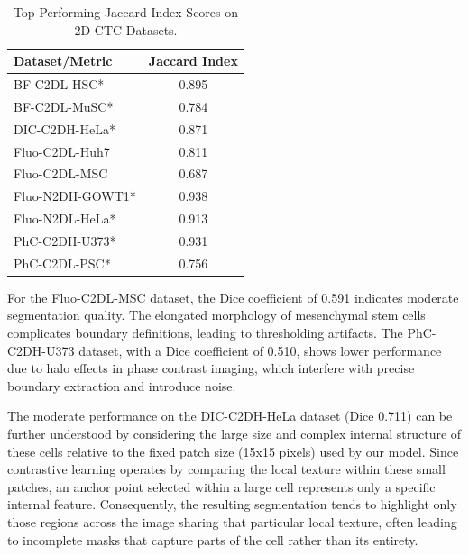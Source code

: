 \documentclass[./dissertation.tex]{subfiles}
\begin{document}

\begin{table}[h] %
    \centering
    \caption{Top-Performing Jaccard Index Scores on 2D CTC Datasets.} %
    \label{tab:ctc_sota_top1_ji_2d_transposed} %
    \begin{tabular}{|l|c|} %
        \hline
        Dataset/Metric   & Jaccard Index \\ \hline
        BF-C2DL-HSC*     & 0.895         \\ \hline
        BF-C2DL-MuSC*    & 0.784         \\ \hline
        DIC-C2DH-HeLa*   & 0.871         \\ \hline
        Fluo-C2DL-Huh7   & 0.811         \\ \hline
        Fluo-C2DL-MSC    & 0.687         \\ \hline
        Fluo-N2DH-GOWT1* & 0.938         \\ \hline
        Fluo-N2DL-HeLa*  & 0.913         \\ \hline
        PhC-C2DH-U373*   & 0.931         \\ \hline
        PhC-C2DL-PSC*    & 0.756         \\ \hline
    \end{tabular}
\end{table}

For the Fluo-C2DL-MSC dataset, the Dice coefficient of 0.591 indicates moderate segmentation quality. The elongated morphology of mesenchymal stem cells complicates boundary definitions, leading to thresholding artifacts. The PhC-C2DH-U373 dataset, with a Dice coefficient of 0.510, shows lower performance due to halo effects in phase contrast imaging, which interfere with precise boundary extraction and introduce noise.

The moderate performance on the DIC-C2DH-HeLa dataset (Dice 0.711) can be further understood by considering the large size and complex internal structure of these cells relative to the fixed patch size (15x15 pixels) used by our model. Since contrastive learning operates by comparing the local texture within these small patches, an anchor point selected within a large cell represents only a specific internal feature. Consequently, the resulting segmentation tends to highlight only those regions across the image sharing that particular local texture, often leading to incomplete masks that capture parts of the cell rather than its entirety.
\end{document}
